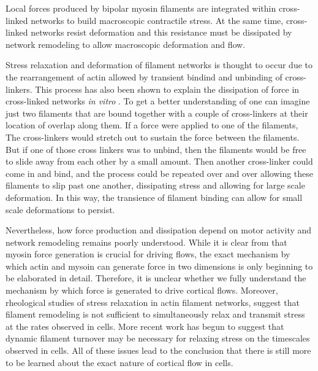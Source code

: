 Local forces produced by bipolar myosin filaments are integrated within cross-linked networks to build macroscopic contractile stress\cite{Murrell:2015aa,Bendix20083126,Janson1005}.  At the same time, cross-linked networks resist deformation and this resistance must be dissipated by network remodeling to allow macroscopic deformation and flow. 

Stress relaxation and deformation of filament networks is thought to occur due to the rearrangement of actin allowed by transient bindind and unbinding of cross-linkers\cite{Ahmed26052015}.  This process has also been shown to explain the dissipation of force in cross-linked networks \textit{in vitro} \cite{PhysRevLett.101.108101}.  To get a better understanding of  one can imagine just two filaments that are bound together with a couple of cross-linkers at their location of overlap along them.  If a force were applied to one of the filaments,  The cross-linkers would stretch out to sustain the force between the filaments.  But if one of those cross linkers was to unbind, then the filaments would be free to slide away from each other by a small amount.  Then another cross-linker could come in and bind, and the process could be repeated over and over allowing these filaments to slip past one another, dissipating stress and allowing for large scale deformation.  In this way, the transience of filament binding can allow for small scale deformations to persist.


Nevertheless, how force production and dissipation depend on motor activity and network remodeling remains poorly understood.  While it is clear from  \cite{cellmech_flows} that myosin force generation is crucial for driving flows, the exact mechanism by which actin and mysoin can generate force in two dimensions is only beginning to be elaborated in detail\cite{PhysRevX.4.041002}.  Therefore, it is unclear whether we fully understand the mechanism by which force is generated to drive cortical flows.  Moreover, rheological studies of stress relaxation in actin filament networks, suggest that filament remodeling is not sufficient to simultaneously relax and transmit stress at the rates observed in cells\cite{De-La-Cruz:2015aa}.  More recent work \cite{Kim2014526} has begun to suggest that dynamic filament turnover may be necessary for relaxing stress on the timescales observed in cells.  All of these issues lead to the conclusion that there is still more to be learned about the exact nature of cortical flow in cells.

